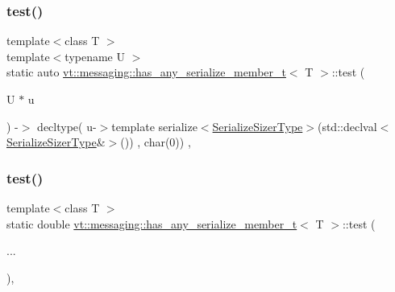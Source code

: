 \subsubsection{\texorpdfstring{test()}{test()}\hspace{0.1cm}{\footnotesize\ttfamily [1/2]}}
{\footnotesize\ttfamily template$<$class T $>$ \\
template$<$typename U $>$ \\
static auto \hyperlink{structvt_1_1messaging_1_1has__any__serialize__member__t}{vt\+::messaging\+::has\+\_\+any\+\_\+serialize\+\_\+member\+\_\+t}$<$ T $>$\+::test (\begin{DoxyParamCaption}\item[{U $\ast$}]{u }\end{DoxyParamCaption}) -\/$>$ decltype(
      u-\/$>$template serialize$<$\hyperlink{namespacevt_1_1messaging_ad46de1ccda6ed95e8bb11e85c28be878}{Serialize\+Sizer\+Type}$>$(std\+::declval$<$\hyperlink{namespacevt_1_1messaging_ad46de1ccda6ed95e8bb11e85c28be878}{Serialize\+Sizer\+Type}\&$>$())
      , char(0)) \hspace{0.3cm}{\ttfamily [inline]}, {\ttfamily [static]}}

\mbox{\label{structvt_1_1messaging_1_1has__any__serialize__member__t_a1a258eb4994a16e4359a9c1c21d71de7}} 
\subsubsection{\texorpdfstring{test()}{test()}\hspace{0.1cm}{\footnotesize\ttfamily [2/2]}}
{\footnotesize\ttfamily template$<$class T $>$ \\
static double \hyperlink{structvt_1_1messaging_1_1has__any__serialize__member__t}{vt\+::messaging\+::has\+\_\+any\+\_\+serialize\+\_\+member\+\_\+t}$<$ T $>$\+::test (\begin{DoxyParamCaption}\item[{}]{... }\end{DoxyParamCaption})\hspace{0.3cm}{\ttfamily [inline]}, {\ttfamily [static]}}




